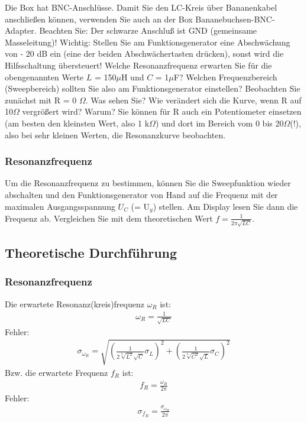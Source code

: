 \documentclass[12pt]{scrartcl}
\begin{document}

Die Box hat BNC-Anschlüsse. Damit Sie den LC-Kreis über Bananenkabel anschließen können, verwenden Sie auch an der Box Bananebuchsen-BNC-Adapter. Beachten Sie: Der schwarze Anschluß ist GND (gemeinsame
Masseleitung)! Wichtig: Stellen Sie am Funktionsgenerator eine Abschwächung von - 20 dB ein (eine der beiden Abschwächertasten drücken), sonst wird die Hilfsschaltung übersteuert! Welche Resonanzfrequenz erwarten Sie für die obengenannten Werte
$L$ = 150$\mu$H und $C$ = 1$\mu$F? Welchen Frequenzbereich (Sweepbereich) sollten Sie also am Funktionsgenerator einstellen?
Beobachten Sie zunächst mit R = 0
$\Omega$. Was sehen Sie? Wie verändert sich die Kurve, wenn R auf 10$\Omega$ vergrößert wird? Warum? Sie können für R auch ein Potentiometer einsetzen (am besten den kleinsten Wert, also 1 k$\Omega$) und dort im Bereich vom 0 bis 20$\Omega$(!), also bei sehr kleinen Werten, die Resonanzkurve beobachten.
\subsubsection{Resonanzfrequenz}
Um die Resonanzfrequenz zu bestimmen, können Sie die Sweepfunktion wieder abschalten und den Funktionsgenerator von Hand auf die Frequenz mit der maximalen Ausgangsspannung
$U_C$ (= U$_y$) stellen. Am Display lesen Sie dann die Frequenz ab. Vergleichen Sie mit dem theoretischen Wert
$f = \frac{1}{2 \pi \sqrt{LC}}$.
\subsection{Theoretische Durchführung}
\subsubsection{Resonanzfrequenz}
Die erwartete Resonanz(kreis)frequenz $\omega_R$ ist:
\begin{align}
\omega_R = \frac{1}{\sqrt{LC}}
\label{eqn:reso_kreis}
\end{align}
Fehler:
\begin{align}
\sigma_{\omega_R} = \sqrt{
\left(\frac{1}{2\sqrt[3]{L^2}\sqrt{C}}\sigma_L\right)^2+
\left(\frac{1}{2\sqrt[3]{C^2}\sqrt{L}}\sigma_C\right)^2}
\label{eqn:reso_kreis_sigma}
\end{align}
Bzw. die erwartete Frequenz $f_R$ ist:
\begin{align}
f_R = \frac{\omega_R}{2\pi}
\label{eqn:reso}
\end{align}
Fehler:
\begin{align}
\sigma_{f_R} = \frac{\sigma_{\omega_R}}{2 \pi}
\label{eqn:reso_sigma}
\end{align}
\end{document}

